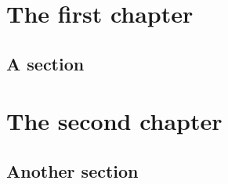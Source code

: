 \documentclass[11pt,a4paper]{report}
\begin{document}
\chapter{The first chapter}
\lipsum[1-8]
\section{A section}
\lipsum[9-16]
\chapter{The second chapter}
\lipsum[17-22]
\section{Another section}
\lipsum[23-30]
\end{document}
